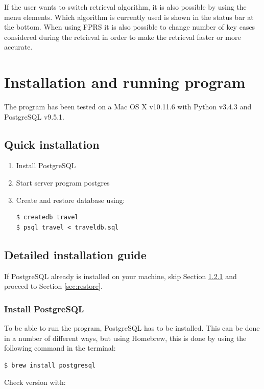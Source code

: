 \documentclass[12pt]{article}
\begin{document}
If the user wants to switch retrieval algorithm, it is also possible by using the menu elements. Which algorithm is currently used is shown in the status bar at the bottom. When using FPRS it is also possible to change number of key cases considered during the retrieval in order to make the retrieval faster or more accurate. 

\clearpage

\section{Installation and running program}
\label{sec:install}

The program has been tested on a Mac OS X v10.11.6 with Python v3.4.3 and PostgreSQL v9.5.1. 

\subsection{Quick installation}
\label{sec:quick}

\begin{enumerate}
\item Install PostgreSQL
\item Start server program postgres
\item Create and restore database using:
\begin{lstlisting}
$ createdb travel
$ psql travel < traveldb.sql
\end{lstlisting}
\end{enumerate}

\subsection{Detailed installation guide}
\label{sec:detail}

If PostgreSQL already is installed on your machine, skip Section \ref{sec:install-postgres} and proceed to Section \ref{sec:restore}.

\subsubsection{Install PostgreSQL}
\label{sec:install-postgres}

To be able to run the program, PostgreSQL has to be installed. This can be done in a number of different ways, but using Homebrew, this is done by using the following command in the terminal:

\begin{lstlisting}
$ brew install postgresql
\end{lstlisting}
Check version with:
\end{document}
